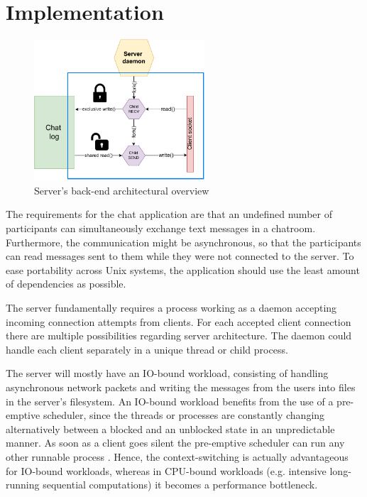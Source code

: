 \section{Implementation}
\begin{figure}[!t]
	\centering
	\includegraphics[width=2.5in]{img/server.pdf}
	\caption{Server's back-end architectural overview}
	\label{fig_server_backend}
\end{figure}
The requirements for the chat application are that an undefined number of participants can simultaneously exchange text messages in a chatroom. Furthermore, the communication might be asynchronous, so that the participants can read messages sent to them while they were not connected to the server. To ease portability across Unix systems, the application should use the least amount of dependencies as possible.

The server fundamentally requires a process working as a daemon accepting incoming connection attempts from clients. For each accepted client connection there are multiple possibilities regarding server architecture. The daemon could handle each client separately in a unique thread or child process.

The server will mostly have an IO-bound workload, consisting of handling asynchronous network packets and writing the messages from the users into files in the server's filesystem. An IO-bound workload benefits from the use of a pre-emptive scheduler, since the threads or processes are constantly changing alternatively between a blocked and an unblocked state in an unpredictable manner. As soon as a client goes silent the pre-emptive scheduler can run any other runnable process \cite{Kennedy2018}. Hence, the context-switching is actually advantageous for IO-bound workloads, whereas in CPU-bound workloads (e.g. intensive long-running sequential computations) it becomes a performance bottleneck.

